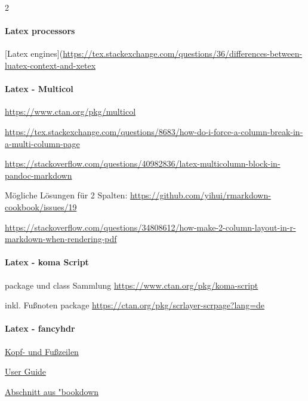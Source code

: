 \documentclass[
  twoside]{article}
\let\oldparagraph\paragraph
\renewcommand{\paragraph}[1]{\oldparagraph{#1}\mbox{}}
\begin{document}
\begin {multicols}{2}
\hypertarget{latex-processors}{%
\paragraph{Latex processors}\label{latex-processors}}

{[}Latex
engines{]}(\url{https://tex.stackexchange.com/questions/36/differences-between-luatex-context-and-xetex}

\hypertarget{latex---multicol}{%
\paragraph{Latex - Multicol}\label{latex---multicol}}

\url{https://www.ctan.org/pkg/multicol}

\url{https://tex.stackexchange.com/questions/8683/how-do-i-force-a-column-break-in-a-multi-column-page}

\url{https://stackoverflow.com/questions/40982836/latex-multicolumn-block-in-pandoc-markdown}

Mögliche Lösungen für 2 Spalten:
\url{https://github.com/yihui/rmarkdown-cookbook/issues/19}

\url{https://stackoverflow.com/questions/34808612/how-make-2-column-layout-in-r-markdown-when-rendering-pdf}

\hypertarget{latex---koma-script}{%
\paragraph{Latex - koma Script}\label{latex---koma-script}}

package und class Sammlung \url{https://www.ctan.org/pkg/koma-script}

inkl. Fußnoten package
\url{https://ctan.org/pkg/scrlayer-scrpage?lang=de}

\hypertarget{latex---fancyhdr}{%
\paragraph{Latex - fancyhdr}\label{latex---fancyhdr}}

\href{https://ctan.org/pkg/fancyhdr?lang=de}{Kopf- und Fußzeilen}

\href{http://tug.ctan.org/tex-archive/macros/latex/contrib/fancyhdr/fancyhdr.pdf}{User
Guide}

\href{https://bookdown.org/yihui/rmarkdown-cookbook/latex-header.html}{Abschnitt
aus "bookdown}

\newpage


\end{multicols}
\end{document}
